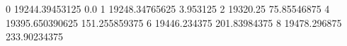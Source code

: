 0 19244.39453125 0.0
1 19248.34765625 3.953125
2 19320.25 75.85546875
4 19395.650390625 151.255859375
6 19446.234375 201.83984375
8 19478.296875 233.90234375
